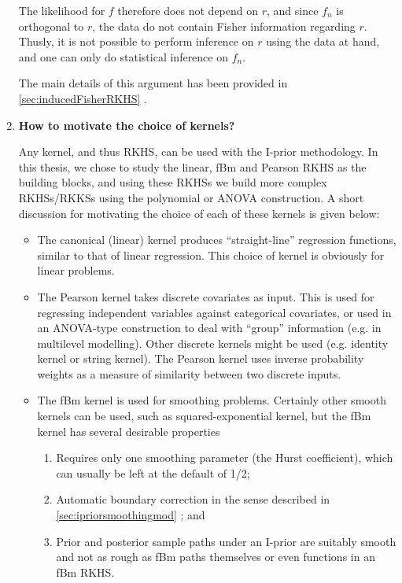 \documentclass[11pt,showframe,twoside,openright]{report}
\begin{document}
\begin{enumerate}
  The likelihood for $f$ therefore does not depend on $r$, and since $f_n$ is orthogonal to $r$, the data do not contain Fisher information regarding $r$.
  Thusly, it is not possible to perform inference on $r$ using the data at hand, and one can only do statistical inference on $f_n$.
  
  The main details of this argument has been provided in \cref{sec:inducedFisherRKHS} .
  
  \item \textbf{How to motivate the choice of kernels?}
  
  Any kernel, and thus RKHS, can be used with the I-prior methodology.
  In this thesis, we chose to study the linear, fBm and Pearson RKHS as the building blocks, and using these RKHSs we build more complex RKHSs/RKKSs using the polynomial or ANOVA construction.
  A short discussion for motivating the choice of each of these kernels is given below:
  \begin{itemize}
    \item The canonical (linear) kernel produces ``straight-line'' regression functions, similar to that of linear regression. This choice of kernel is obviously for linear problems.
    \item The Pearson kernel takes discrete covariates as input. This is used for regressing independent variables against categorical covariates, or used in an ANOVA-type construction to deal with ``group'' information (e.g. in multilevel modelling). Other discrete kernels might be used (e.g. identity kernel or string kernel). The Pearson kernel uses inverse probability weights as a measure of similarity between two discrete inputs.
    \item The fBm kernel is used for smoothing problems. Certainly other smooth kernels can be used, such as squared-exponential kernel, but the fBm kernel has several desirable properties
    \begin{enumerate}
      \item Requires only one smoothing parameter (the Hurst coefficient), which can usually be left at the default of 1/2; 
      \item Automatic boundary correction in the sense described in \cref{sec:ipriorsmoothingmod} ; and 
      \item Prior and posterior sample paths under an I-prior are suitably smooth and not as rough as fBm paths themselves or even functions in an fBm RKHS.
    \end{enumerate}
  \end{itemize}
  

\end{enumerate}
\end{document}
